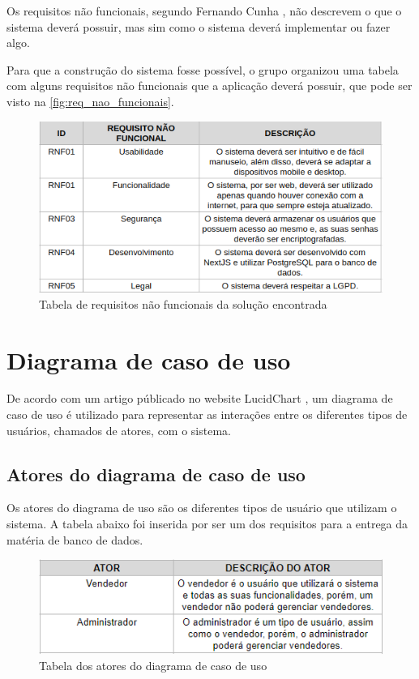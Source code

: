 \documentclass[serif, english, brazilian, oneside]{uffstex}
\begin{document}
Os requisitos não funcionais, segundo Fernando Cunha \cite{requisitos-o-que-sao}, não descrevem o que o sistema deverá possuir, mas sim como o sistema deverá implementar ou fazer algo.

Para que a construção do sistema fosse possível, o grupo organizou uma tabela com alguns requisitos não funcionais que a aplicação deverá possuir, que pode ser visto na \autoref{fig:req_nao_funcionais}.

\begin{figure}[!htpb]
    \centering
    \caption{Tabela de requisitos não funcionais da solução encontrada}
    \label{fig:req_nao_funcionais}
    \includegraphics[width=\linewidth]{imagens/req_nao_funcionais.png}
\end{figure}

\section{Diagrama de caso de uso}

De acordo com um artigo públicado no website LucidChart \cite{diagrama-de-caso-de-uso}, um diagrama de caso de uso é utilizado para representar as interações entre os diferentes tipos de usuários, chamados de atores, com o sistema.

\subsection{Atores do diagrama de caso de uso}

Os atores do diagrama de uso são os diferentes tipos de usuário que utilizam o sistema. A tabela abaixo foi inserida por ser um dos requisitos para a entrega da matéria de banco de dados.

\begin{figure}[!htpb]
    \centering
    \caption{Tabela dos atores do diagrama de caso de uso}
    \label{fig:atores_caso_uso}
    \includegraphics[width=0.7\linewidth]{imagens/atores_diagrama_caso_uso.png}
\end{figure}
\end{document}
